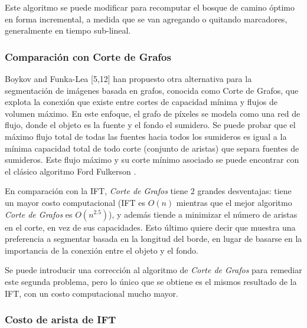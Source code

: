 \documentclass[a4paper,10pt]{article}
\begin{document}
Este algoritmo se puede modificar para recomputar el bosque de camino óptimo
en forma incremental, a medida que se van agregando o quitando marcadores,
generalmente en tiempo sub-lineal.

\subsubsection{Comparación con Corte de Grafos}

Boykov and Funka-Lea [5,12] han propuesto otra alternativa para la segmentación
de imágenes basada en grafos, conocida como Corte de Grafos, que explota
la conexión que existe entre cortes de capacidad mínima y flujos de volumen
máximo. En este enfoque, el grafo de píxeles se modela como una red de flujo,
donde el objeto es la fuente y el fondo el sumidero. Se puede probar que el máximo flujo total de todas las fuentes
hacia todos los sumideros es igual a la mínima capacidad total de todo corte
(conjunto de aristas) que separa fuentes de sumideros. Este flujo máximo y su
corte mínimo asociado se puede encontrar con el clásico algoritmo
Ford Fulkerson \cite{Cormen:2009:IAT:1614191}.

En comparación con la IFT, \textit{Corte de Grafos} tiene 2 grandes desventajas:
tiene un mayor costo computacional (IFT es $O(n)$ mientras que
el mejor algoritmo \textit{Corte de Grafos} es $O(n^{2.5})$), y además tiende a
minimizar el número de aristas en el corte, en vez de sus capacidades. Esto
último quiere decir que muestra una preferencia a segmentar basada en la
longitud del borde, en lugar de basarse en la importancia de la conexión
entre el objeto y el fondo.\cite{journals/jmiv/MirandaF09}

Se puede introducir una corrección al algoritmo de \textit{Corte de Grafos} para
remediar este segunda problema, pero lo único que se obtiene es el mismos
resultado de la IFT, con un costo computacional mucho mayor. \cite{journals/jmiv/MirandaF09}

\subsubsection{Costo de arista de IFT}
\end{document}
